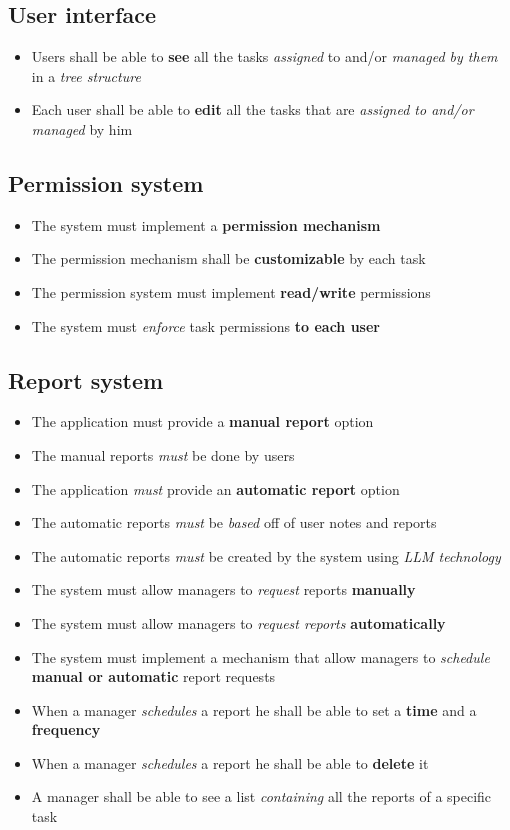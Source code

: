 \documentclass{article}
\begin{document}
\subsection{User interface}
\begin{itemize}
    \item Users shall be able to \textbf{see} all the tasks \textit{assigned} to and/or \textit{managed by them} in a \textit{tree structure}
    \item Each user shall be able to \textbf{edit} all the tasks that are \textit{assigned to and/or managed} by him
\end{itemize}
\subsection{Permission system}
\begin{itemize}
    \item The system must implement a \textbf{permission mechanism}
    \item The permission mechanism shall be \textbf{customizable} by each task
    \item The permission system must implement \textbf{read/write} permissions
    \item The system must \textit{enforce} task permissions \textbf{to each user}
\end{itemize}
\subsection{Report system}
\begin{itemize}
    \item The application must provide a \textbf{manual report} option
    \item The manual reports \textit{must} be done by users
    \item The application \textit{must} provide an \textbf{automatic report} option
    \item The automatic reports \textit{must} be \textit{based} off of user notes and reports
    \item The automatic reports \textit{must} be created by the system using \textit{LLM technology}
    \item The system must allow managers to \textit{request} reports \textbf{manually}
    \item The system must allow managers to \textit{request reports} \textbf{automatically}
    \item The system must implement a mechanism that allow managers to \textit{schedule} \textbf{manual or automatic }report requests
    \item When a manager \textit{schedules} a report he shall be able to set a \textbf{time} and a \textbf{frequency}
    \item When a manager \textit{schedules} a report he shall be able to \textbf{delete} it
    \item A manager shall be able to see a list \textit{containing} all the reports of a specific task
\end{itemize}
\end{document}
